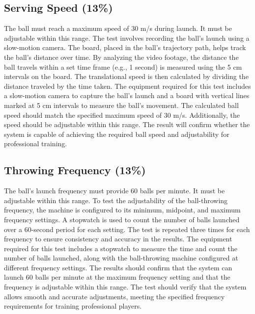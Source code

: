 \documentclass[12pt]{report}
\begin{document}
\subsection{Serving Speed (13\%)}
The ball must reach a maximum speed of 30 m/s during launch. It must be adjustable within this range. The test involves recording the ball's launch using a slow-motion camera. The board, placed in the ball’s trajectory path, helps track the ball’s distance over time. By analyzing the video footage, the distance the ball travels within a set time frame (e.g., 1 second) is measured using the 5 cm intervals on the board. The translational speed is then calculated by dividing the distance traveled by the time taken. The equipment required for this test includes a slow-motion camera to capture the ball’s launch and a board with vertical lines marked at 5 cm intervals to measure the ball’s movement. The calculated ball speed should match the specified maximum speed of 30 m/s. Additionally, the speed should be adjustable within this range. The result will confirm whether the system is capable of achieving the required ball speed and adjustability for professional training.
\subsection{Throwing Frequency (13\%)}
The ball’s launch frequency must provide 60 balls per minute. It must be adjustable within this range. To test the adjustability of the ball-throwing frequency, the machine is configured to its minimum, midpoint, and maximum frequency settings. A stopwatch is used to count the number of balls launched over a 60-second period for each setting. The test is repeated three times for each frequency to ensure consistency and accuracy in the results. The equipment required for this test includes a stopwatch to measure the time and count the number of balls launched, along with the ball-throwing machine configured at different frequency settings. The results should confirm that the system can launch 60 balls per minute at the maximum frequency setting and that the frequency is adjustable within this range. The test should verify that the system allows smooth and accurate adjustments, meeting the specified frequency requirements for training professional players.
\end{document}
